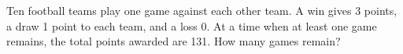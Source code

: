 Ten football teams play one game against each other team. A win gives 3 points, a draw 1 point to each team, and a loss 0. At a time when at least one game remains, the total points awarded are 131. How many games remain?
